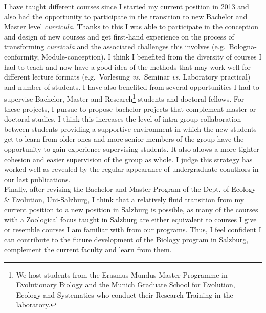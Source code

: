 \documentclass[a4paper,11pt]{article}
\begin{document}
I have taught different courses since I started my current position in 2013 and also had the opportunity to participate in the transition to new Bachelor and Master level \emph{curricula}. Thanks to this I was able to participate in the conception and design of new courses and get first-hand experience on the process of transforming \emph{curricula} and the associated challenges this involves (e.g.~Bologna-conformity, Module-conception). I think I benefited from the diversity of courses I had to teach and now have a good idea of the methods that may work well for different lecture formats (e.g.~Vorlesung \emph{vs.}~Seminar \emph{vs.} Laboratory practical) and number of students. I have also benefited from several opportunities I had to supervise Bachelor, Master and Research\footnote{We host students from the Erasmus Mundus Master Programme in Evolutionary Biology and the Munich Graduate School for Evolution, Ecology and Systematics who conduct their Research Training in the laboratory.} students and doctoral fellows. For these projects, I pursue to propose bachelor projects that complement master or doctoral studies. I think this increases the level of intra-group collaboration between students providing a supportive environment in which the new students get to learn from older ones and more senior members of the group have the opportunity to gain experience supervising students. It also allows a more tighter cohesion and easier supervision of the group as whole. I judge this strategy has worked well as revealed by the regular appearance of undergraduate coauthors in our last publications.\\

Finally, after revising the Bachelor and Master Program of the Dept. of Ecology \& Evolution, Uni-Salzburg, I think that a relatively fluid transition from my current position to a new position in Salzburg is possible, as many of the courses with a Zoological focus taught in Salzburg are either equivalent to courses I give or resemble courses I am familiar with from our programs. Thus, I feel confident I can contribute to the future development of the Biology program in Salzburg, complement the current faculty and learn from them.




\end{document}

